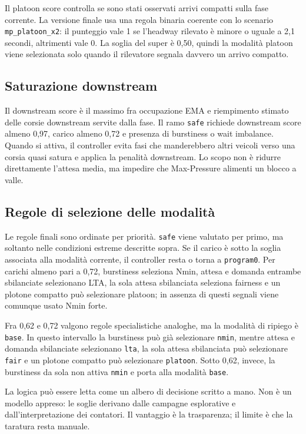 \documentclass[12pt,a4paper,oneside]{report}
\numberwithin{equation}{chapter}
\begin{document}
Il platoon score controlla se sono stati osservati arrivi compatti sulla fase
corrente. La versione finale usa una regola binaria coerente con lo scenario
\texttt{mp\_platoon\_x2}: il punteggio vale 1 se l'headway rilevato è minore o
uguale a 2,1 secondi, altrimenti vale 0. La soglia del super è 0,50, quindi la
modalità platoon viene selezionata solo quando il rilevatore segnala davvero un
arrivo compatto.

\subsection{Saturazione downstream}

Il downstream score è il massimo fra occupazione EMA e riempimento stimato
delle corsie downstream servite dalla fase. Il ramo \texttt{safe} richiede
downstream score almeno 0,97, carico almeno 0,72 e presenza di burstiness o wait
imbalance. Quando si attiva, il controller evita fasi che manderebbero altri
veicoli verso una corsia quasi satura e applica la penalità downstream. Lo scopo
non è ridurre direttamente l'attesa media, ma impedire che Max-Pressure alimenti
un blocco a valle.

\subsection{Regole di selezione delle modalità}

Le regole finali sono ordinate per priorità. \texttt{safe} viene valutato per
primo, ma soltanto nelle condizioni estreme descritte sopra. Se il carico è
sotto la soglia associata alla modalità corrente, il controller resta o torna a
\texttt{program0}. Per carichi almeno pari a 0,72, burstiness seleziona Nmin,
attesa e domanda entrambe sbilanciate selezionano LTA, la sola attesa
sbilanciata seleziona fairness e un plotone compatto può selezionare platoon;
in assenza di questi segnali viene comunque usato Nmin forte.

Fra 0,62 e 0,72 valgono regole specialistiche analoghe, ma la modalità di
ripiego è \texttt{base}. In questo intervallo la burstiness può già selezionare
\texttt{nmin}, mentre attesa e domanda sbilanciate selezionano \texttt{lta}, la
sola attesa sbilanciata può selezionare \texttt{fair} e un plotone compatto può
selezionare \texttt{platoon}. Sotto 0,62, invece, la burstiness da sola non
attiva \texttt{nmin} e porta alla modalità \texttt{base}.

La logica può essere letta come un albero di decisione scritto a mano. Non è un
modello appreso: le soglie derivano dalle campagne esplorative e
dall'interpretazione dei contatori. Il vantaggio è la trasparenza; il limite è
che la taratura resta manuale.
\end{document}
